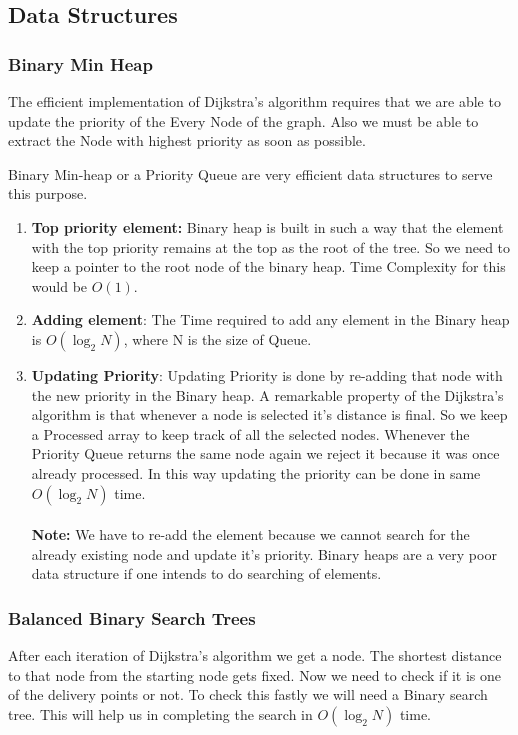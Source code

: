 \documentclass{article}
\begin{document}
\subsection{Data Structures}

\subsubsection{Binary Min Heap}
The efficient implementation of Dijkstra's algorithm requires that we are able to update the priority of the Every Node of the graph. Also we must be able to extract the Node with highest priority as soon as possible.
\\
\par Binary Min-heap or a Priority Queue are very efficient data structures to serve this purpose.
\begin{enumerate}
    \item \textbf{Top priority element:}  Binary heap is built in such a way that the element with the top priority remains at the top as the root of the tree. So we need to keep a pointer to the root node of the binary heap. Time Complexity for this would be $O(1)$. 
    \item \textbf{Adding element}: The Time required to add any element in the Binary heap is $O(\log_2 N)$, where N is the size of Queue.
    \item \textbf{Updating Priority}: Updating Priority is done by re-adding that node with the new priority in the Binary heap. A remarkable property of the Dijkstra's algorithm is that whenever a node is selected it's distance is final. So we keep a Processed array to keep track of all the selected nodes. Whenever the Priority Queue returns the same node again we reject it because it was once already processed. In this way updating the priority can be done in same $O(\log_2 N)$ time.
    \\\\
    \textbf{Note:} We have to re-add the element because we cannot search for the already existing node and update it's priority. Binary heaps are a very poor data structure if one intends to do searching of elements.
\end{enumerate}

\subsubsection{Balanced Binary Search Trees}
After each iteration of Dijkstra's algorithm we get a node. The shortest distance to that node from the starting node gets fixed. Now we need to check if it is one of the delivery points or not. To check this fastly we will need a Binary search tree. This will help us in completing the search in $O(\log_2 N)$ time.
\end{document}
